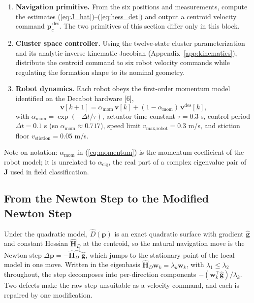 \documentclass[lettersize,journal]{IEEEtran}
\begin{document}
\begin{enumerate}
    \item \textbf{Navigation primitive.} From the six positions and
          measurements, compute the estimates
          (\ref{eq:J_hat})--(\ref{eq:hess_det}) and output a centroid
          velocity command $\dot{\mathbf{p}}_c^{\,\text{des}}$. The two
          primitives of this section differ only in this block.
    \item \textbf{Cluster space controller.} Using the twelve-state
          cluster parameterization and its analytic inverse kinematic
          Jacobian (Appendix~\ref{app:kinematics}), distribute the
          centroid command to six robot velocity commands while
          regulating the formation shape to its nominal geometry.
    \item \textbf{Robot dynamics.} Each robot obeys the first-order
          momentum model identified on the Decabot hardware [6],
          \begin{equation}
              \mathbf{v}[k+1] = \alpha_{\text{mom}}\,\mathbf{v}[k]
              + (1 - \alpha_{\text{mom}})\,\mathbf{v}^{\text{des}}[k],
              \label{eq:momentum}
          \end{equation}
          with $\alpha_{\text{mom}} = \exp(-\Delta t/\tau)$, actuator
          time constant $\tau = 0.3$ s, control period $\Delta t = 0.1$ s
          (so $\alpha_{\text{mom}} \approx 0.717$), speed limit
          $v_{\text{max,robot}} = 0.3$ m/s, and stiction floor
          $v_{\text{stiction}} = 0.05$ m/s.
\end{enumerate}

Note on notation: $\alpha_{\text{mom}}$ in (\ref{eq:momentum}) is the
momentum coefficient of the robot model; it is unrelated to
$\alpha_{\text{eig}}$, the real part of a complex eigenvalue pair of
$\mathbf{J}$ used in field classification.

\subsection{From the Newton Step to the Modified Newton Step}
\label{sec:mod_newton}

Under the quadratic model, $\hat{D}(\mathbf{p})$ is an exact quadratic
surface with gradient $\hat{\mathbf{g}}$ and constant Hessian
$\hat{\mathbf{H}}_D$ at the centroid, so the natural navigation move is
the Newton step $\Delta\mathbf{p} = -\hat{\mathbf{H}}_D^{-1}
\hat{\mathbf{g}}$, which jumps to the stationary point of the local
model in one move. Written in the eigenbasis
$\hat{\mathbf{H}}_D \mathbf{w}_k = \lambda_k \mathbf{w}_k$, with
$\lambda_1 \leq \lambda_2$ throughout, the step decomposes into
per-direction components $-(\mathbf{w}_k^\top
\hat{\mathbf{g}})/\lambda_k$. Two defects make the raw step unsuitable
as a velocity command, and each is repaired by one modification.
\end{document}
